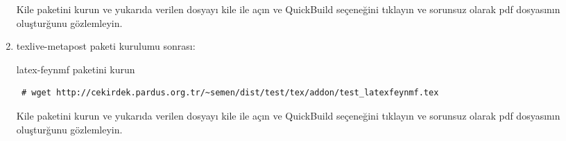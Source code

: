 \documentclass[a4paper,10pt]{article}
\begin{document}
\begin{enumerate}
Kile paketini kurun ve yukarıda verilen dosyayı kile ile açın ve QuickBuild  seçeneğini tıklayın ve sorunsuz olarak pdf dosyasının oluşturğunu gözlemleyin.

\item texlive-metapost paketi kurulumu sonrası:

latex-feynmf paketini kurun
\begin{verbatim}
 # wget http://cekirdek.pardus.org.tr/~semen/dist/test/tex/addon/test_latexfeynmf.tex
\end{verbatim}

Kile paketini kurun ve yukarıda verilen dosyayı kile ile açın ve QuickBuild  seçeneğini tıklayın ve sorunsuz olarak pdf dosyasının oluşturğunu gözlemleyin.

\end{enumerate}
\end{document}
